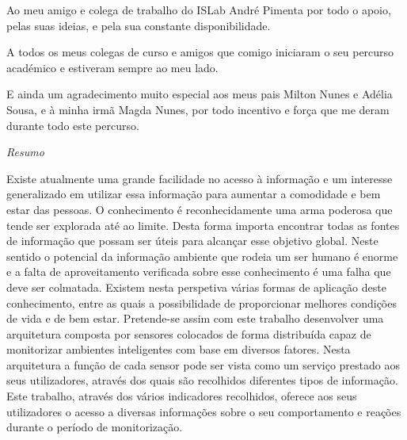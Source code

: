 \documentclass[a4paper, 12pt, oneside]{Thesis}  %
\begin{document}
Ao meu amigo e colega de trabalho do ISLab André Pimenta por todo o apoio, pelas suas ideias, e pela sua constante disponibilidade.

A todos os meus colegas de curso e amigos que comigo iniciaram o seu percurso académico e estiveram sempre ao meu lado.

E ainda um agradecimento muito especial aos meus pais Milton Nunes e Adélia Sousa, e à minha irmã Magda Nunes, por todo incentivo e força que me deram durante todo este percurso.

\newpage
\thispagestyle{empty}
\mbox{}





\begin{center}
{\large \textit{Resumo} }
\end{center}


\vspace{0.5cm}
\quad Existe atualmente uma grande facilidade no acesso à informação e um interesse generalizado em utilizar essa informação para aumentar a comodidade e bem estar das pessoas. O conhecimento é reconhecidamente uma arma poderosa que tende ser explorada até ao limite. Desta forma importa encontrar todas as fontes de informação que possam ser úteis para alcançar esse objetivo global. Neste sentido o potencial da informação ambiente que rodeia um ser humano é enorme e a falta de aproveitamento verificada sobre esse conhecimento é uma falha que deve ser colmatada. Existem nesta perspetiva várias formas de aplicação deste conhecimento, entre as quais a possibilidade de proporcionar melhores condições de vida e de bem estar. Pretende-se assim com este trabalho desenvolver uma arquitetura composta por sensores colocados de forma distribuída capaz de monitorizar ambientes inteligentes com base em diversos fatores. Nesta arquitetura a função de cada sensor pode ser vista como um serviço prestado aos seus utilizadores, através dos quais são recolhidos diferentes tipos de informação. Este trabalho, através dos vários indicadores recolhidos, oferece aos seus utilizadores o acesso a diversas informações sobre o seu comportamento e reações durante o período de monitorização.
\end{document}

